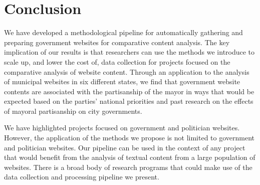 \documentclass[11pt]{article}
\begin{document}
\section{Conclusion}


We have developed a methodological pipeline for automatically gathering and preparing government websites for comparative content analysis. The key implication of our results is that researchers can use the methods we introduce to scale up, and lower the cost of, data collection for projects focused on the comparative analysis of website content. Through an application to the analysis of municipal websites in six different states, we find that government website contents are associated with the partisanship of the mayor in ways that would be expected based on the parties' national priorities and past research on the effects of mayoral partisanship on city governments.

We have highlighted projects focused on government and politician websites. However, the application of the methods we propose is not limited to government and politician websites. Our pipeline can be used in the context of any project that would benefit from the analysis of textual content from a large population of websites. There is a broad body of research programs that could make use of the data collection and processing pipeline we present.
 



%
%

%

\end{document}
